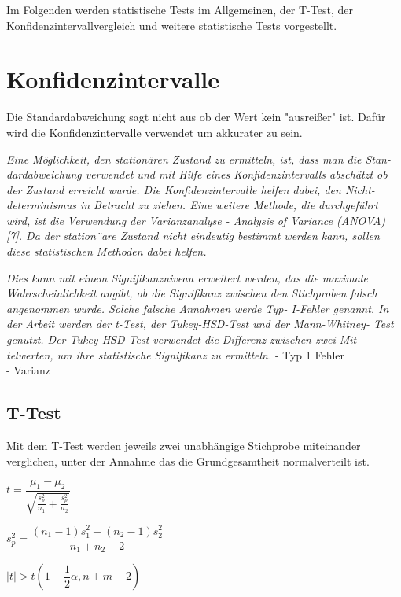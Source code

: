 Im Folgenden werden statistische Tests im
Allgemeinen, der T-Test, der Konfidenzintervallvergleich und weitere statistische Tests
vorgestellt.

\section{Konfidenzintervalle}
Die Standardabweichung sagt nicht aus ob der Wert kein "ausreißer" ist. Dafür wird die Konfidenzintervalle verwendet
um akkurater zu sein.

\textit{Eine Möglichkeit, den stationären Zustand zu ermitteln, ist, dass man die Stan-
dardabweichung verwendet und mit Hilfe eines Konfidenzintervalls abschätzt ob
der Zustand erreicht wurde. Die Konfidenzintervalle helfen dabei, den Nicht-
determinismus in Betracht zu ziehen. Eine weitere Methode, die durchgeführt
wird, ist die Verwendung der Varianzanalyse - Analysis of Variance (ANOVA)
[7]. Da der station¨are Zustand nicht eindeutig bestimmt werden kann, sollen
diese statistischen Methoden dabei helfen.}

\textit{Dies kann mit einem Signifikanzniveau erweitert werden,
das die maximale Wahrscheinlichkeit angibt, ob die Signifikanz zwischen den
Stichproben falsch angenommen wurde. Solche falsche Annahmen werde Typ-
I-Fehler genannt.
In der Arbeit werden der t-Test, der Tukey-HSD-Test und der Mann-Whitney-
Test genutzt. Der Tukey-HSD-Test verwendet die Differenz zwischen zwei Mit-
telwerten, um ihre statistische Signifikanz zu ermitteln.}
- Typ 1 Fehler \\
- Varianz
\subsection{T-Test}
Mit dem T-Test werden jeweils zwei unabhängige Stichprobe miteinander verglichen, 
unter der Annahme das die Grundgesamtheit normalverteilt ist.

\begin{center}
  $t = \dfrac{\mu_1-\mu_2}{\sqrt{\frac{s_p^2}{n_1} + \frac{s_p^2}{n_2}}}$
\end{center}

\begin{center}
  $s^2_p = \dfrac{(n_1 - 1)s^2_1 + (n_2 - 1)s^2_2}{n_1 + n_2 - 2}$
\end{center}

\begin{center}
  $|t| > t(1 - \dfrac{1}{2}\alpha, n + m - 2)$
\end{center}

